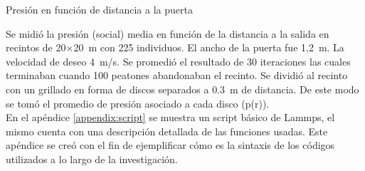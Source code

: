 {\Large Presión en función de distancia a la puerta}

Se midió la presión (social) media en función de la distancia a la salida en recintos de 20$\times$20~m con 225 individuos. El ancho de la puerta fue 1,2~m. La velocidad de deseo 4~m/s. Se promedió el resultado de 30 iteraciones las cuales terminaban cuando 100 peatones abandonaban el recinto. Se dividió al recinto con un grillado en forma de discos separados a 0.3~m de distancia. De este modo se tomó el promedio de presión asociado a cada disco (p(r)). \\

En el apéndice \ref{appendix:script} se muestra un script básico de Lammps, el mismo cuenta con una descripción detallada de las funciones usadas. Este apéndice se creó con el fin de ejemplificar cómo es la sintaxis de los códigos utilizados a lo largo de la investigación. 




